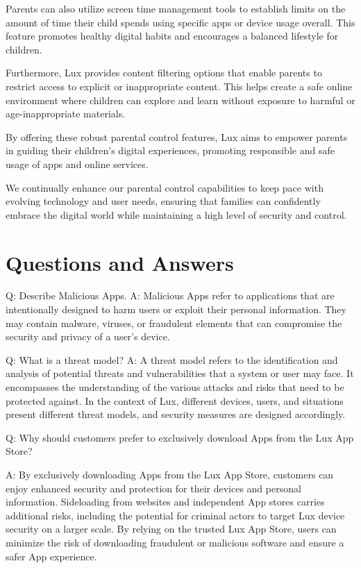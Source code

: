 \documentclass[11pt]{article}
\begin{document}
Parents can also utilize screen time management tools to establish limits on the amount of time their child spends using specific apps or device usage overall. This feature promotes healthy digital habits and encourages a balanced lifestyle for children.


Furthermore, Lux provides content filtering options that enable parents to restrict access to explicit or inappropriate content. This helps create a safe online environment where children can explore and learn without exposure to harmful or age-inappropriate materials.


By offering these robust parental control features, Lux aims to empower parents in guiding their children's digital experiences, promoting responsible and safe usage of apps and online services.


We continually enhance our parental control capabilities to keep pace with evolving technology and user needs, ensuring that families can confidently embrace the digital world while maintaining a high level of security and control.


\section{Questions and Answers}

Q: Describe Malicious Apps. A: Malicious Apps refer to applications that are intentionally designed to harm users or exploit their personal information. They may contain malware, viruses, or fraudulent elements that can compromise the security and privacy of a user's device.


Q: What is a threat model? A: A threat model refers to the identification and analysis of potential threats and vulnerabilities that a system or user may face. It encompasses the understanding of the various attacks and risks that need to be protected against. In the context of Lux, different devices, users, and situations present different threat models, and security measures are designed accordingly.


Q: Why should customers prefer to exclusively download Apps from the Lux App Store?


A: By exclusively downloading Apps from the Lux App Store, customers can enjoy enhanced security and protection for their devices and personal information. Sideloading from websites and independent App stores carries additional risks, including the potential for criminal actors to target Lux device security on a larger scale. By relying on the trusted Lux App Store, users can minimize the risk of downloading fraudulent or malicious software and ensure a safer App experience.
\end{document}
